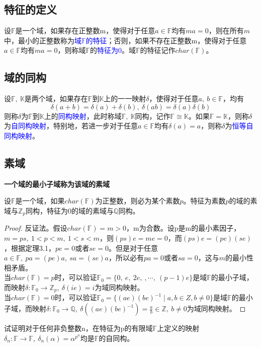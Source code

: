 \documentclass[cn,10pt]{elegantbook}
\begin{document}
\subsection{特征的定义}
\begin{definition}
  设$\mathbb{F}$是一个域，如果存在正整数m，使得对于任意$a \in \mathbb{F}$均有$ma = 0$，则在所有$m$中，最小的正整数称为\textcolor{blue}{域$\mathbb{F}$的特征}；否则，如果不存在正整数m，使得对于任意$a \in \mathbb{F}$均有$ma =0$，则称域$\mathbb{F}$的\textcolor{blue}{特征为0}。域$\mathbb{F}$的特征记作$char(\mathbb{F})$。
\end{definition}
\subsection{域的同构}
\begin{definition}
  设$\mathbb{F},\ \mathbb{K}$是两个域，如果存在$\mathbb{F}$到$\mathbb{K}$上的一一映射$\delta$，使得对于任意$a,\ b \in \mathbb{F}$，均有
  \begin{equation*}
    \delta (a+b) = \delta (a)+\delta (b),\ \delta (ab) = \delta (a)\delta (b)
  \end{equation*} 
  则称$\delta $为$\mathbb{F}$到$\mathbb{K}$上的\textcolor{blue}{同构映射}，此时称域$\mathbb{F},\ \mathbb{K}$同构，记作$\mathbb{F} \cong \mathbb{K}$。如果$\mathbb{F}=\mathbb{K}$，则称$\delta $为\textcolor{blue}{自同构映射}，特别地，若进一步对于任意$a \in \mathbb{F}$均有$\delta (a) = a$，则称$\delta $为\textcolor{blue}{恒等自同构映射}。
\end{definition}
\subsection{素域} 
\textbf{一个域的最小子域称为该域的素域}
\begin{theorem}
  设$\mathbb{F}$是一个域，如果$char(\mathbb{F})$为正整数，则必为某个素数$p$。特征为素数$p$的域的素域与$\mathbb{Z}_p$同构，特征为0的域的素域与$\mathbb{Q}$同构。
\end{theorem}
\begin{proof}
  反证法。假设$char(\mathbb{F}) = m >0$，m为合数。设p是m的最小素因子，$m = ps,\ 1 < p<m,\ 1<s<m$，则$(ps)e = me = 0$，而$(ps)e = (pe)(se)$，根据定理3.1，$pe = 0$或者$se = 0$。但是对于任意$a \in \mathbb{F},\ pa = (pe)a,\ sa = (se)a$，所以必有$pa = 0$或者$sa = 0$，这与$m$的最小性相矛盾。
  \\
  当$char(\mathbb{F})=p$时，可以验证$\mathbb{F}_0=\{0,\ e,\ 2e,\ ,\cdots ,\ (p-1)e \}$是域$\mathbb{F}$的最小子域，而映射$\delta: \mathbb{F}_0 \rightarrow \mathbb{Z}_p,\ \delta(ie) = i$为域同构映射。
  \\
  当$char(\mathbb{F}) = 0$时，可以验证$\mathbb{F}_0 = \{(ae)(be)^{-1} \mid a,b \in Z,b \neq 0\}$是域$\mathbb{F}$的最小子域，而映射$\delta: \mathbb{F}_0 \rightarrow \mathbb{Q},\ \delta((ae)(be)^{-1})=\frac{a}{b} \in \mathbb{Z},\ b \neq 0$为域同构映射。
\end{proof}
\begin{exercise}
  试证明对于任何非负整数n，在特征为p的有限域$\mathbb{F}$上定义的映射$\delta_n:\mathbb{F} \rightarrow \mathbb{F},\ \delta_n(\alpha)=\alpha^{p^n}$均是$\mathbb{F}$的自同构。
\end{exercise}
\end{document}
